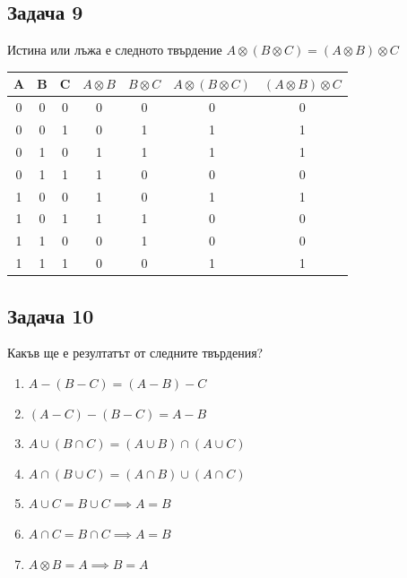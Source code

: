 \documentclass[fleqn, 12pt]{article}
\theoremstyle{definition}
\begin{document}
\newpage
\subsection*{Задача 9}
Истина или лъжа е следното твърдение $A \otimes (B \otimes C) = (A \otimes B) \otimes C$
\begin{table}[htp]
\begin{center}
\begin{tabular}{|c|c|c|c|c|c|c|} 
\hline
 A & B & C  & $A \otimes B$ & $B \otimes C$ & $A \otimes (B \otimes C)$ & $(A \otimes B) \otimes C$  \\
\hline
0 & 0 & 0 & 0 & 0 & 0 & 0 \\
\hline
0 & 0 & 1 & 0 & 1 & 1 & 1 \\
\hline
0 & 1 & 0 & 1 & 1 & 1 & 1 \\
\hline
0 & 1 & 1 & 1 & 0 & 0 & 0 \\
\hline
1 & 0 & 0 & 1 & 0 & 1 & 1 \\
\hline
1 & 0 & 1 & 1 & 1 & 0 & 0 \\
\hline
1 & 1 & 0 & 0 & 1 & 0 & 0 \\
\hline
1 & 1 & 1 & 0 & 0 & 1 & 1 \\
\hline
\end{tabular}
\end{center}
\end{table}
\newpage

\subsection*{Задача 10}
Какъв ще е резултатът от следните твърдения?
\begin{enumerate}
\item $A - (B - C) = (A - B) - C$
\item $(A-C) - (B-C) = A - B$
\item $A \cup (B \cap C) = (A \cup B) \cap (A \cup C)$
\item $A \cap (B \cup C) = (A \cap B) \cup (A \cap C)$
\item $A\cup C = B \cup C \implies A = B$
\item $A\cap C = B \cap C \implies A = B$
\item $A \otimes B = A \implies B =A$
\end{enumerate}
\end{document}
